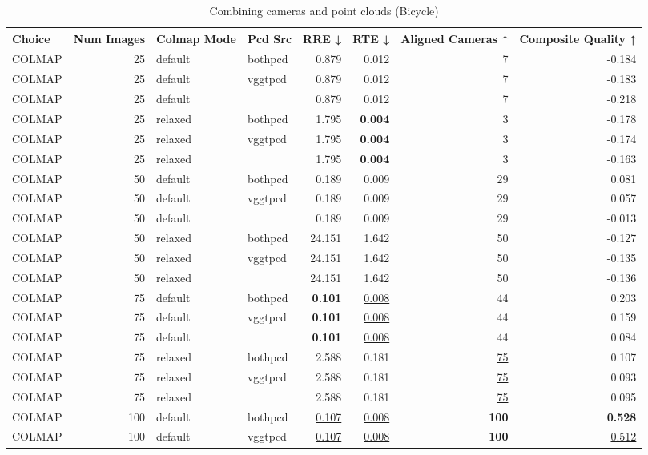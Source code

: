 \begin{table}[H]
\caption{Combining cameras and point clouds (Bicycle)}
\label{tab:07_combined_align_relaxed_bicycle}
\begin{tabular}{lrllrrrr}
\toprule
Choice & Num Images & Colmap Mode & Pcd Src & RRE ↓ & RTE ↓ & Aligned Cameras ↑ & Composite Quality ↑ \\
\midrule
COLMAP & 25 & default & bothpcd & 0.879 & 0.012 & 7 & -0.184 \\
COLMAP & 25 & default & vggtpcd & 0.879 & 0.012 & 7 & -0.183 \\
COLMAP & 25 & default &  & 0.879 & 0.012 & 7 & -0.218 \\
COLMAP & 25 & relaxed & bothpcd & 1.795 & \textbf{0.004} & 3 & -0.178 \\
COLMAP & 25 & relaxed & vggtpcd & 1.795 & \textbf{0.004} & 3 & -0.174 \\
COLMAP & 25 & relaxed &  & 1.795 & \textbf{0.004} & 3 & -0.163 \\
COLMAP & 50 & default & bothpcd & 0.189 & 0.009 & 29 & 0.081 \\
COLMAP & 50 & default & vggtpcd & 0.189 & 0.009 & 29 & 0.057 \\
COLMAP & 50 & default &  & 0.189 & 0.009 & 29 & -0.013 \\
COLMAP & 50 & relaxed & bothpcd & 24.151 & 1.642 & 50 & -0.127 \\
COLMAP & 50 & relaxed & vggtpcd & 24.151 & 1.642 & 50 & -0.135 \\
COLMAP & 50 & relaxed &  & 24.151 & 1.642 & 50 & -0.136 \\
COLMAP & 75 & default & bothpcd & \textbf{0.101} & \underline{0.008} & 44 & 0.203 \\
COLMAP & 75 & default & vggtpcd & \textbf{0.101} & \underline{0.008} & 44 & 0.159 \\
COLMAP & 75 & default &  & \textbf{0.101} & \underline{0.008} & 44 & 0.084 \\
COLMAP & 75 & relaxed & bothpcd & 2.588 & 0.181 & \underline{75} & 0.107 \\
COLMAP & 75 & relaxed & vggtpcd & 2.588 & 0.181 & \underline{75} & 0.093 \\
COLMAP & 75 & relaxed &  & 2.588 & 0.181 & \underline{75} & 0.095 \\
COLMAP & 100 & default & bothpcd & \underline{0.107} & \underline{0.008} & \textbf{100} & \textbf{0.528} \\
COLMAP & 100 & default & vggtpcd & \underline{0.107} & \underline{0.008} & \textbf{100} & \underline{0.512} \\

\end{tabular}
\end{table}
